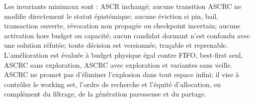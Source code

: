Les invariants minimaux sont : ASCR inchangé; aucune transition ASCRC ne modifie directement le statut épistémique; aucune éviction si pin, bail, transaction ouverte, révocation non propagée ou checkpoint incertain; aucune activation hors budget ou capacité; aucun candidat dormant n'est confondu avec une solution réfutée; toute décision est versionnée, traçable et reprenable. L'amélioration est évaluée à budget physique égal contre FIFO, best-first seul, ASCRC sans exploration, ASCRC avec exploration et variantes sans veille. ASCRC ne promet pas d'éliminer l'explosion dans tout espace infini; il vise à contrôler le working set, l'ordre de recherche et l'équité d'allocation, en complément du filtrage, de la génération paresseuse et du partage.
